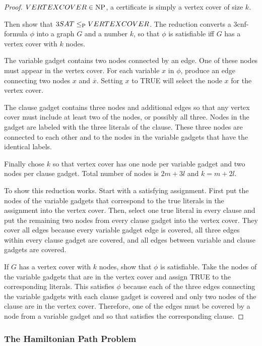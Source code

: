 \begin{mdframed}
\begin{proof}
$VERTEXCOVER \in \NP$, a certificate is simply a vertex cover of size $k$.

\medskip
Then show that $3SAT \leq_\P VERTEXCOVER$. The reduction converts a 3cnf-formula $\phi$ into a graph $G$ and a number $k$, so that $\phi$ is satisfiable iff $G$ has a vertex cover with $k$ nodes.

\medskip
The variable gadget contains two nodes connected by an edge. One of these nodes must appear in the vertex cover. For each variable $x$ in $\phi$, produce an edge connecting two nodes $x$ and $\overline{x}$. Setting $x$ to TRUE will select the node $x$ for the vertex cover.

The clause gadget contains three nodes and additional edges so that any vertex cover must include at least two of the nodes, or possibly all three. Nodes in the gadget are labeled with the three literals of the clause. These three nodes are connected to each other and to the nodes in the variable gadgets that have the identical labels.

Finally chose $k$ so that vertex cover has one node per variable gadget and two nodes per clause gadget. Total number of nodes is $2m + 3l$ and $k = m + 2l$.

\medskip
To show this reduction works. Start with a satisfying assignment. First put the nodes of the variable gadgets that correspond to the true literals in the assignment into the vertex cover. Then, select one true literal in every clause and put the remaining two nodes from every clause gadget into the vertex cover. They cover all edges because every variable gadget edge is covered, all three edges within every clause gadget are covered, and all edges between variable and clause gadgets are covered.

If $G$ has a vertex cover with $k$ nodes, show that $\phi$ is satisfiable. Take the nodes of the variable gadgets that are in the vertex cover and assign TRUE to the corresponding literals. This satisfies $\phi$ because each of the three edges connecting the variable gadgets with each clause gadget is covered and only two nodes of the clause are in the vertex cover. Therefore, one of the edges must be covered by a node from a variable gadget and so that satisfies the corresponding clause.
\end{proof}
\end{mdframed}

\subsubsection{The Hamiltonian Path Problem}


